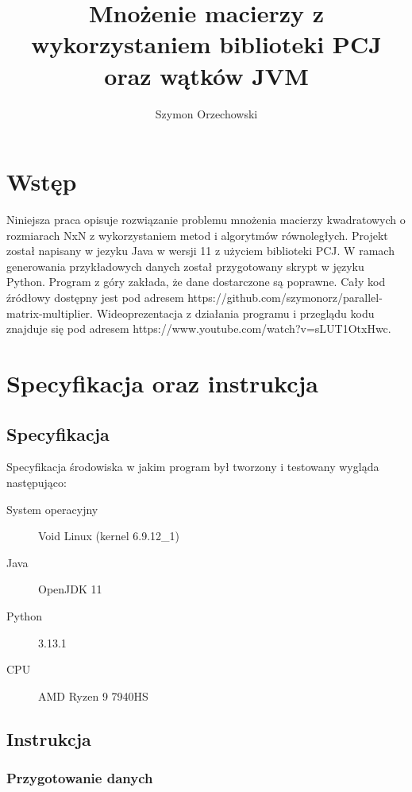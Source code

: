 \documentclass[11pt]{article}
\title{Mnożenie macierzy z wykorzystaniem biblioteki PCJ oraz wątków JVM}
\author{Szymon Orzechowski}
\date{}
\begin{document}
    \maketitle

    \clearpage

    \tableofcontents

    \clearpage

    \section{Wstęp}

    Niniejsza praca opisuje rozwiązanie problemu mnożenia macierzy kwadratowych o rozmiarach NxN z wykorzystaniem metod i algorytmów równoległych.
    Projekt został napisany w jezyku Java w wersji 11 z użyciem biblioteki PCJ. W ramach generowania przykładowych danych został przygotowany skrypt
    w języku Python. Program z góry zakłada, że dane dostarczone są poprawne.
    Cały kod źródłowy dostępny jest pod adresem https://github.com/szymonorz/parallel-matrix-multiplier.
    Wideoprezentacja z działania programu i przeglądu kodu znajduje się pod adresem https://www.youtube.com/watch?v=sLUT1OtxHwc.
    
    \section{Specyfikacja oraz instrukcja}

    \subsection{Specyfikacja}
    Specyfikacja środowiska w jakim program był tworzony i testowany wygląda następująco:

    \begin{description}
        \item[System operacyjny] Void Linux (kernel 6.9.12\_1)
        \item[Java] OpenJDK 11
        \item[Python] 3.13.1
        \item[CPU] AMD Ryzen 9 7940HS
    \end{description}

    \subsection{Instrukcja}
    \subsubsection{Przygotowanie danych}
\end{document}
